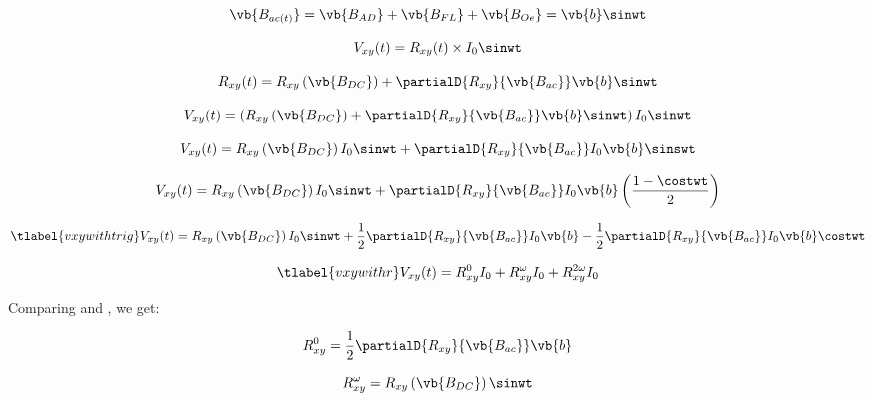 \begin{equation}
    \vb{B_{ac(t)}} = \vb{B_{AD}} + \vb{B_{FL}} + \vb{B_{Oe}} = \vb{b} \sinwt
\end{equation}

\begin{equation}
    V_{xy}(t) = R_{xy}(t) \times I_{0} \sinwt
\end{equation}

\begin{equation}
    R_{xy}(t) = R_{xy} \left( \vb{B_{DC}} \right) + \partialD{R_{xy}}{\vb{B_{ac}}} \vb{b} \sinwt
\end{equation}

\begin{equation}
    V_{xy}(t) = \left( 
        R_{xy} \left( \vb{B_{DC}} \right) +
        \partialD{R_{xy}}{\vb{B_{ac}}} \vb{b} \sinwt
    \right) I_{0} \sinwt
\end{equation}

\begin{equation}
    V_{xy}(t) = R_{xy} \left( \vb{B_{DC}} \right) I_{0} \sinwt + 
    \partialD{R_{xy}}{\vb{B_{ac}}} I_{0} \vb{b} \sinswt
\end{equation}

\begin{equation}
    V_{xy}(t) = R_{xy} \left( \vb{B_{DC}} \right) I_{0} \sinwt + 
    \partialD{R_{xy}}{\vb{B_{ac}}} I_{0} \vb{b} \left( \frac{1 - \costwt}{2} \right)
\end{equation}

\begin{equation}
    \tlabel{vxywithtrig}
    V_{xy}(t) = R_{xy} \left( \vb{B_{DC}} \right) I_{0} \sinwt + 
    \frac{1}{2} \partialD{R_{xy}}{\vb{B_{ac}}} I_{0} \vb{b}  - 
    \frac{1}{2} \partialD{R_{xy}}{\vb{B_{ac}}} I_{0} \vb{b} \costwt
\end{equation}

\begin{equation}
    \tlabel{vxywithr}
    V_{xy}(t) = R^{0}_{xy} I_{0} + R^{\omega}_{xy} I_{0} + R^{2 \omega}_{xy} I_{0}
\end{equation}

Comparing  and , we get:

\begin{equation}
    R^{0}_{xy} = \frac{1}{2} \partialD{R_{xy}}{\vb{B_{ac}}} \vb{b} 
\end{equation}

\begin{equation}
    R^{\omega}_{xy} = R_{xy} \left( \vb{B_{DC}} \right)  \sinwt 
\end{equation}

